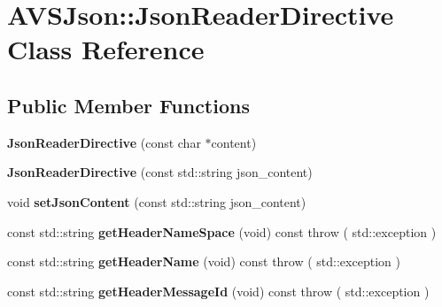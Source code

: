 \hypertarget{classAVSJson_1_1JsonReaderDirective}{}\section{A\+V\+S\+Json\+:\+:Json\+Reader\+Directive Class Reference}
\label{classAVSJson_1_1JsonReaderDirective}
\subsection*{Public Member Functions}
\begin{DoxyCompactItemize}
\item 
\mbox{\label{classAVSJson_1_1JsonReaderDirective_ab6c68ee0fc053c88d3dfaa14c2244aee}} 
{\bfseries Json\+Reader\+Directive} (const char $\ast$content)
\item 
\mbox{\label{classAVSJson_1_1JsonReaderDirective_ad511f1ba5d09b960ef3f7dbc1fea675a}} 
{\bfseries Json\+Reader\+Directive} (const std\+::string json\+\_\+content)
\item 
\mbox{\label{classAVSJson_1_1JsonReaderDirective_a9b54950c28c51b173cbe089b64132ed2}} 
void {\bfseries set\+Json\+Content} (const std\+::string json\+\_\+content)
\item 
\mbox{\label{classAVSJson_1_1JsonReaderDirective_a6b11c4fde5d9317cd08921d533f3bf23}} 
const std\+::string {\bfseries get\+Header\+Name\+Space} (void) const  throw ( std\+::exception )
\item 
\mbox{\label{classAVSJson_1_1JsonReaderDirective_a62db5edd8cbefbafa5baefd0b1a8c42c}} 
const std\+::string {\bfseries get\+Header\+Name} (void) const  throw ( std\+::exception )
\item 
\mbox{\label{classAVSJson_1_1JsonReaderDirective_abf9ccee441e6bc2e76717a24ed93b5be}} 
const std\+::string {\bfseries get\+Header\+Message\+Id} (void) const  throw ( std\+::exception )
\item 
\mbox{\label{classAVSJson_1_1JsonReaderDirective_a5b591a4d16a05976e81f945752b3987b}} 

\end{DoxyCompactItemize}
